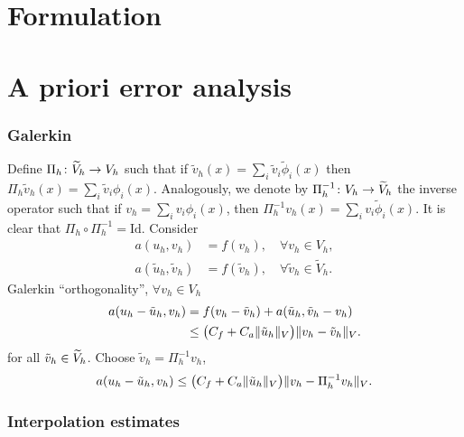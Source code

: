 \documentclass[10pt]{article}
\begin{document}
	
\maketitle	

\section{Formulation} 

\section{A priori error analysis}

\subsubsection*{Galerkin}
Define	$\Pi_h \colon \widetilde V_h \to V_h$ such that if $\tilde v_h(x) = \sum_i \tilde v_i \tilde \phi_i(x)$ then $\Pi_h \tilde v_h(x) = \sum_i \tilde v_i \phi_i(x)$. Analogously, we denote by $\Pi_h^{-1}\colon V_h \to \widetilde V_h$ the inverse operator such that if $v_h = \sum_i v_i \phi_i(x)$, then $\Pi_h^{-1} v_h(x) = \sum_i v_i \tilde \phi_i(x)$. It is clear that $\Pi_h \circ \Pi_h^{-1} = \mathrm{Id}$. Consider
\begin{equation}
\begin{aligned}
	a(u_h, v_h) &= f(v_h), \quad \forall v_h \in V_h,\\
	a(\tilde u_h, \tilde v_h) &= f(\tilde v_h), \quad \forall \tilde v_h \in \tilde V_h.
\end{aligned}
\end{equation}
Galerkin ``orthogonality'', $\forall v_h \in V_h$
\begin{equation}
\begin{aligned}
	a(u_h - \tilde u_h, v_h) &= f(v_h - \tilde v_h) + a(\tilde u_h, \tilde v_h - v_h)\\
	&\leq \big(C_f + C_a \lVert\tilde u_h\rVert_V \big) \lVert v_h - \tilde v_h\rVert_V.
\end{aligned}
\end{equation}
for all $\tilde v_h \in \widetilde V_h$. Choose $\tilde v_h = \Pi_h^{-1} v_h$, 
\begin{equation}
	a(u_h - \tilde u_h, v_h) \leq \big(C_f + C_a \lVert\tilde u_h\rVert_V \big) \lVert v_h - \Pi_h^{-1} v_h\rVert_V.
\end{equation}

\subsubsection*{Interpolation estimates}
\end{document}
